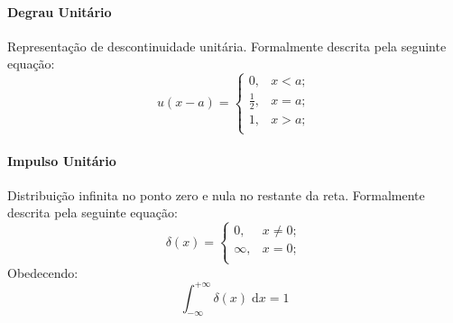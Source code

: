\documentclass{article}
\begin{document}
                    \begin{multicols}{2}
                        \raggedcolumns
                        \paragraph{Degrau Unitário}Representação de descontinuidade unitária. Formalmente descrita pela seguinte equação:
                        \begin{equation}
                            \boxed{
                                u(x - a) = 
                                \begin{cases}
                                    0, & x < a;\\
                                    \frac{1}{2}, & x = a;\\
                                    1, & x > a;\\
                                \end{cases}
                            }
                        \end{equation}

                        \columnbreak

                        \paragraph{Impulso Unitário}Distribuição infinita no ponto zero e nula no restante da reta. Formalmente descrita pela seguinte equação:
                            \begin{equation}
                                \boxed{
                                    \delta(x) = 
                                    \begin{cases}
                                        0, & x \neq 0;\\
                                        \infty, & x = 0;\\
                                    \end{cases}
                                    }
                                \end{equation}
                        Obedecendo:
                            \begin{equation*}
                                \int_{-\infty}^{+\infty} \delta(x) \; \text{d}x = 1
                            \end{equation*}
                \end{multicols}
\end{document}
